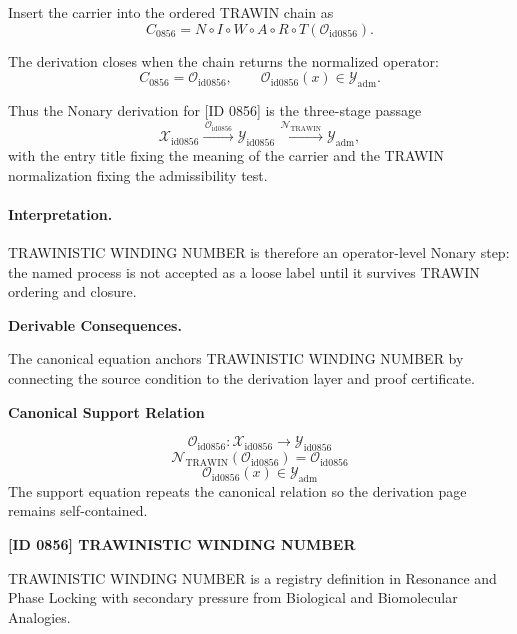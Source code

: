 Insert the carrier into the ordered TRAWIN chain as\[
C_{0856}=N\circ I\circ W\circ A\circ R\circ T(\mathcal{O}_{\mathrm{id0856}}).
\]

The derivation closes when the chain returns the normalized operator:\[
C_{0856}=\mathcal{O}_{\mathrm{id0856}},\qquad \mathcal{O}_{\mathrm{id0856}}(x)\in\mathcal{Y}_{\mathrm{adm}}.
\]

Thus the Nonary derivation for [ID 0856] is the three-stage passage
\[
\mathcal{X}_{\mathrm{id0856}}\xrightarrow{\,\mathcal{O}_{\mathrm{id0856}}\,} \mathcal{Y}_{\mathrm{id0856}}\xrightarrow{\,\mathcal{N}_{\mathrm{TRAWIN}}\,} \mathcal{Y}_{\mathrm{adm}},
\]
with the entry title fixing the meaning of the carrier and the TRAWIN normalization fixing the admissibility test.

\paragraph{Interpretation.} TRAWINISTIC WINDING NUMBER is therefore an operator-level Nonary step: the named process is not accepted as a loose label until it survives TRAWIN ordering and closure.

\par\vspace{0.35em}
\noindent\textbf{Derivable Consequences.}\quad
\begingroup
\footnotesize
\raggedright
The canonical equation anchors TRAWINISTIC WINDING NUMBER by connecting the source condition to the derivation layer and proof certificate.
\par\endgroup

\noindent\textbf{Canonical Support Relation}\par
\[
\mathcal{O}_{\mathrm{id0856}}:\mathcal{X}_{\mathrm{id0856}}\longrightarrow\mathcal{Y}_{\mathrm{id0856}}
\]
\[
\mathcal{N}_{\mathrm{TRAWIN}}(\mathcal{O}_{\mathrm{id0856}})=\mathcal{O}_{\mathrm{id0856}}
\]
\[
\mathcal{O}_{\mathrm{id0856}}(x)\in\mathcal{Y}_{\mathrm{adm}}
\]
\noindent The support equation repeats the canonical relation so the derivation page remains self-contained.\par

\clearpage
\noindent\textbf{[ID 0856] TRAWINISTIC WINDING NUMBER}\par
\vspace{0.35em}
\begingroup\small
{}
TRAWINISTIC WINDING NUMBER is a registry definition in Resonance and Phase Locking with secondary pressure from Biological and Biomolecular Analogies.

